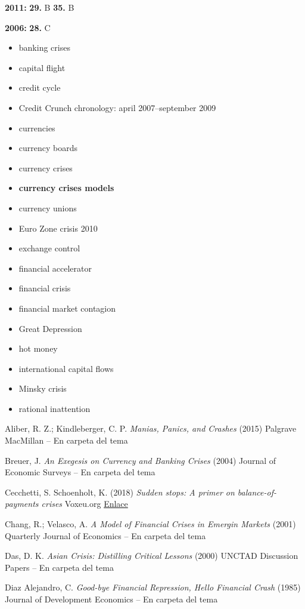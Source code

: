 \documentclass{nuevotema}
\begin{document}
\textbf{2011:} \textbf{29.} B \textbf{35.} B

\textbf{2006:} \textbf{28.} C

\bibliografia

\begin{itemize}
	\item banking crises
	\item capital flight
	\item credit cycle
	\item Credit Crunch chronology: april 2007–september 2009
	\item currencies
	\item currency boards
	\item currency crises
	\item \textbf{currency crises models}
	\item currency unions
	\item Euro Zone crisis 2010
	\item exchange control
	\item financial accelerator
	\item financial crisis
	\item financial market contagion
	\item Great Depression
	\item hot money
	\item international capital flows
	\item Minsky crisis
	\item rational inattention
\end{itemize}

Aliber, R. Z.; Kindleberger, C. P. \textit{Manias, Panics, and Crashes} (2015) Palgrave MacMillan -- En carpeta del tema

Breuer, J. \textit{An Exegesis on Currency and Banking Crises} (2004) Journal of Economic Surveys -- En carpeta del tema

Cecchetti, S. Schoenholt, K. (2018) \textit{Sudden stops: A primer on balance-of-payments crises} Voxeu.org \href{https://voxeu.org/content/sudden-stops-primer-balance-payments-crises}{Enlace}

Chang, R.; Velasco, A. \textit{A Model of Financial Crises in Emergin Markets} (2001) Quarterly Journal of Economics -- En carpeta del tema

Das, D. K. \textit{Asian Crisis: Distilling Critical Lessons} (2000) UNCTAD Discussion Papers -- En carpeta del tema

Diaz Alejandro, C. \textit{Good-bye Financial Repression, Hello Financial Crash} (1985) Journal of Development Economics -- En carpeta del tema
\end{document}
